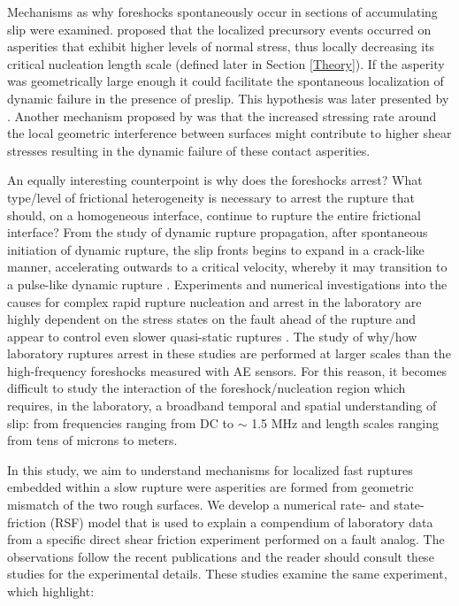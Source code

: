 \documentclass[preprint,1p, 10pt,authoryear]{elsarticle}
\begin{document}
Mechanisms as why foreshocks spontaneously occur in sections of accumulating slip were examined.  \citet{Selvadurai2017} proposed that the localized precursory events occurred on asperities that exhibit higher levels of normal stress, thus locally decreasing its critical nucleation length scale (defined later in Section \ref{Theory}). If the asperity was geometrically large enough it could facilitate the spontaneous localization of dynamic failure in the presence of preslip. This hypothesis was later presented by \citet{McLaskey2019}. Another mechanism proposed by \citet{McLaskey2013} was that the increased stressing rate around the local geometric interference between surfaces might contribute to higher shear stresses resulting in the dynamic failure of these contact asperities.  

An equally interesting counterpoint is why does the foreshocks arrest? What type/level of frictional heterogeneity is necessary to arrest the rupture that should, on a homogeneous interface, continue to rupture the entire frictional interface? From the study of dynamic rupture propagation, after spontaneous initiation of dynamic rupture, the slip fronts begins to expand in a crack-like manner, accelerating outwards to a critical velocity, whereby it may transition to a pulse-like dynamic rupture \citep{Heaton1990, Meier2016}. Experiments and numerical investigations into the causes for complex rapid rupture nucleation and arrest in the laboratory are highly dependent on the stress states on the fault ahead of the rupture \citep{Rubinstein2004, Rubinstein2006, Ben-David2010, Fineberg2015, Maegawa2010, Tromborg2011, Kammer2012, Kammer2015} and appear to control even slower quasi-static ruptures \citep{Selvadurai2017a}. The study of why/how laboratory ruptures arrest in these studies are performed at larger scales than the high-frequency foreshocks measured with AE sensors. For this reason, it becomes difficult to study the interaction of the foreshock/nucleation region which requires, in the laboratory, a broadband temporal and spatial understanding of slip: from frequencies ranging from DC to $\sim$ 1.5 MHz and length scales ranging from tens of microns to meters. 

In this study, we aim to understand mechanisms for localized fast ruptures embedded within a slow rupture were asperities are formed from geometric mismatch of the two rough surfaces. We develop a numerical rate- and state-friction (RSF) model \citep{Dieterich1979,Ampuero2008, Rubin2005} that is used to explain a compendium of laboratory data from a specific direct shear friction experiment performed on a fault analog. The observations follow the recent publications and the reader should consult these studies for the experimental details. These studies examine the same experiment, which highlight:
\end{document}
